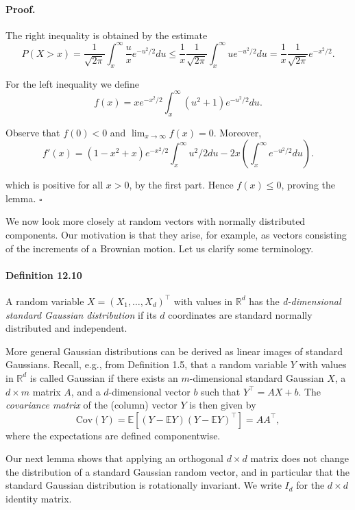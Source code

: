 \documentclass{article}
\begin{document}
\paragraph{Proof.} The right inequality is obtained by the estimate
\[
P(X > x) = \frac{1}{\sqrt{2\pi}} \int_x^{\infty} \frac{u}{x} e^{-u^2/2} du \leq \frac{1}{x} \frac{1}{\sqrt{2\pi}} \int_x^{\infty} u e^{-u^2/2} du = \frac{1}{x} \frac{1}{\sqrt{2\pi}} e^{-x^2/2}.
\]

For the left inequality we define
\[
f(x) = x e^{-x^2/2} \int_x^{\infty} \left( u^2 + 1 \right) e^{-u^2/2} du.
\]

Observe that $f(0) < 0$ and $\lim_{x \to \infty} f(x) = 0$. Moreover,
\[
f'(x) = (1 - x^2 + x) e^{-x^2/2} \int_x^{\infty} u^2/2 du - 2x \left(\int_x^{\infty} e^{-u^2/2} du\right).
\]

which is positive for all $x > 0$, by the first part. Hence $f(x) \leq 0$, proving the lemma. \hfill $\square$

We now look more closely at random vectors with normally distributed components. Our motivation is that they arise, for example, as vectors consisting of the increments of a Brownian motion. Let us clarify some terminology.

\paragraph{Definition 12.10} A random variable $X = (X_1, \ldots, X_d)^\top$ with values in $\mathbb{R}^d$ has the \textit{d-dimensional standard Gaussian distribution} if its $d$ coordinates are standard normally distributed and independent.

More general Gaussian distributions can be derived as linear images of standard Gaussians. Recall, e.g., from Definition 1.5, that a random variable $Y$ with values in $\mathbb{R}^d$ is called Gaussian if there exists an $m$-dimensional standard Gaussian $X$, a $d \times m$ matrix $A$, and a $d$-dimensional vector $b$ such that $Y^\top = AX + b$. The \textit{covariance matrix} of the (column) vector $Y$ is then given by
\[
\text{Cov}(Y) = \mathbb{E}[(Y - \mathbb{E}Y)(Y - \mathbb{E}Y)^\top] = AA^\top,
\]
where the expectations are defined componentwise.

Our next lemma shows that applying an orthogonal $d \times d$ matrix does not change the distribution of a standard Gaussian random vector, and in particular that the standard Gaussian distribution is rotationally invariant. We write $I_d$ for the $d \times d$ identity matrix.
\end{document}
